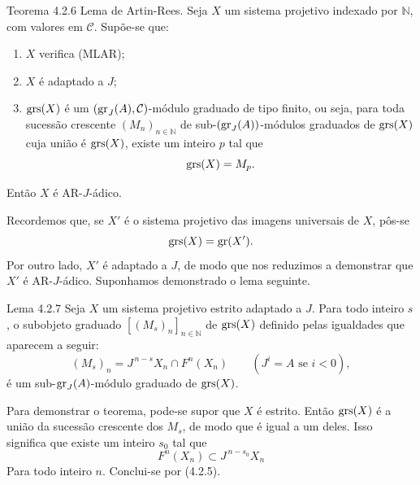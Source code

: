 \begin{statement}{Teorema 4.2.6}
Lema de Artin-Rees. Seja \(X\) um sistema projetivo indexado por \(\mathbb N\), com valores em \(\mathcal C\). Supõe-se que:
\begin{enumerate}[label=\textup{(\roman*)}]
\item \(X\) verifica (MLAR);
\item \(X\) é adaptado a \(J\);
\item \(\operatorname{grs}(X)\) é um \((\operatorname{gr}_J(A),\mathcal C)\)-módulo graduado de tipo finito, ou seja, para toda sucessão crescente \((M_n)_{n\in\mathbb N}\) de sub-\((\operatorname{gr}_J(A))\)-módulos graduados de \(\operatorname{grs}(X)\) cuja união é \(\operatorname{grs}(X)\), existe um inteiro \(p\) tal que
\[
\operatorname{grs}(X)=M_p.
\]
\end{enumerate}
Então \(X\) é AR-\(J\)-ádico.
\end{statement}

\begin{prooftext}
Recordemos que, se \(X'\) é o sistema projetivo das imagens universais de \(X\), pôs-se
\[
\operatorname{grs}(X)=\operatorname{gr}(X').
\]
Por outro lado, \(X'\) é adaptado a \(J\), de modo que nos reduzimos a demonstrar que \(X'\) é AR-\(J\)-ádico. Suponhamos demonstrado o lema seguinte.
\end{prooftext}

\begin{statement}{Lema 4.2.7}
Seja \(X\) um sistema projetivo estrito adaptado a \(J\). Para todo inteiro \(s\), o subobjeto graduado \([(M_s)_n]_{n\in\mathbb N}\) de \(\operatorname{grs}(X)\) definido pelas igualdades que aparecem a seguir:
\[
(M_s)_n=J^{\,n-s}X_n\cap F^n(X_n)\qquad(J^i=A\text{ se }i<0),
\]
é um sub-\(\operatorname{gr}_J(A)\)-módulo graduado de \(\operatorname{grs}(X)\).
\end{statement}

Para demonstrar o teorema, pode-se supor que \(X\) é estrito. Então \(\operatorname{grs}(X)\) é a união da sucessão crescente dos \(M_s\), de modo que é igual a um deles. Isso significa que existe um inteiro \(s_0\) tal que
\[
F^n(X_n)\subset J^{\,n-s_0}X_n
\]
Para todo inteiro \(n\). Conclui-se por (4.2.5).
